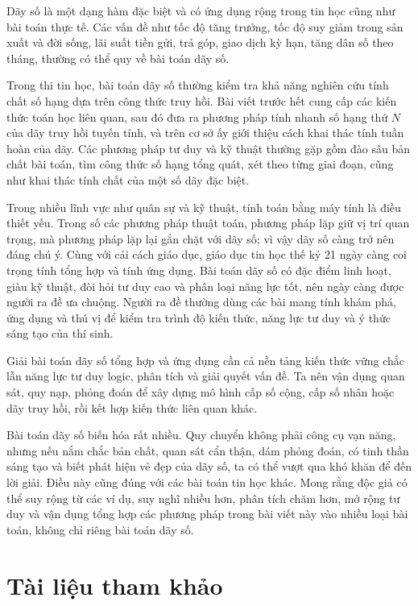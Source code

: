 \documentclass[11pt]{article}
\begin{document}
Dãy số là một dạng hàm đặc biệt và có ứng dụng rộng trong tin học cũng như bài
toán thực tế. Các vấn đề như tốc độ tăng trưởng, tốc độ suy giảm trong sản
xuất và đời sống, lãi suất tiền gửi, trả góp, giao dịch kỳ hạn, tăng dân số
theo tháng, thường có thể quy về bài toán dãy số.

Trong thi tin học, bài toán dãy số thường kiểm tra khả năng nghiên cứu tính
chất số hạng dựa trên công thức truy hồi. Bài viết trước hết cung cấp các kiến
thức toán học liên quan, sau đó đưa ra phương pháp tính nhanh số hạng thứ $N$
của dãy truy hồi tuyến tính, và trên cơ sở ấy giới thiệu cách khai thác tính
tuần hoàn của dãy. Các phương pháp tư duy và kỹ thuật thường gặp gồm đào sâu
bản chất bài toán, tìm công thức số hạng tổng quát, xét theo từng giai đoạn,
cũng như khai thác tính chất của một số dãy đặc biệt.

Trong nhiều lĩnh vực như quân sự và kỹ thuật, tính toán bằng máy tính là điều
thiết yếu. Trong số các phương pháp thuật toán, phương pháp lặp giữ vị trí
quan trọng, mà phương pháp lặp lại gắn chặt với dãy số; vì vậy dãy số càng trở
nên đáng chú ý. Cùng với cải cách giáo dục, giáo dục tin học thế kỷ 21 ngày
càng coi trọng tính tổng hợp và tính ứng dụng. Bài toán dãy số có đặc điểm
linh hoạt, giàu kỹ thuật, đòi hỏi tư duy cao và phân loại năng lực tốt, nên
ngày càng được người ra đề ưa chuộng. Người ra đề thường dùng các bài mang
tính khám phá, ứng dụng và thú vị để kiểm tra trình độ kiến thức, năng lực tư
duy và ý thức sáng tạo của thí sinh.

Giải bài toán dãy số tổng hợp và ứng dụng cần cả nền tảng kiến thức vững chắc
lẫn năng lực tư duy logic, phân tích và giải quyết vấn đề. Ta nên vận dụng
quan sát, quy nạp, phỏng đoán để xây dựng mô hình cấp số cộng, cấp số nhân hoặc
dãy truy hồi, rồi kết hợp kiến thức liên quan khác.

Bài toán dãy số biến hóa rất nhiều. Quy chuyển không phải công cụ vạn năng,
nhưng nếu nắm chắc bản chất, quan sát cẩn thận, dám phỏng đoán, có tinh thần
sáng tạo và biết phát hiện vẻ đẹp của dãy số, ta có thể vượt qua khó khăn để
đến lời giải. Điều này cũng đúng với các bài toán tin học khác. Mong rằng độc
giả có thể suy rộng từ các ví dụ, suy nghĩ nhiều hơn, phân tích chăm hơn, mở
rộng tư duy và vận dụng tổng hợp các phương pháp trong bài viết này vào nhiều
loại bài toán, không chỉ riêng bài toán dãy số.

\section*{Tài liệu tham khảo}
\end{document}
